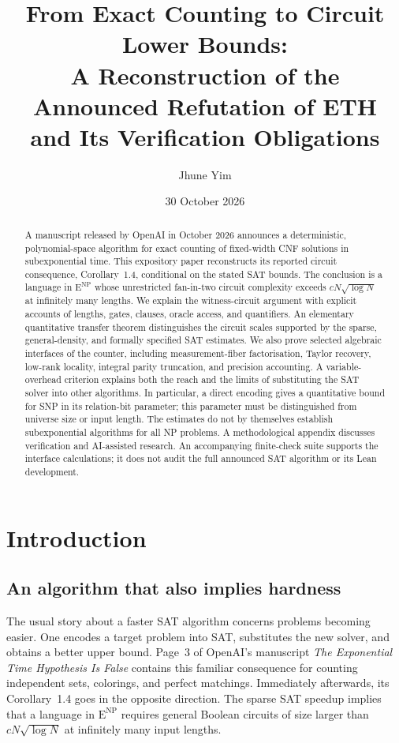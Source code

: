\documentclass[11pt,reqno]{amsart}
\title[From exact counting to circuit lower bounds]{From Exact Counting to
Circuit Lower Bounds:\\ A Reconstruction of the Announced Refutation of ETH\\
and Its Verification Obligations}
\author{Jhune Yim}
\date{30 October 2026}
\numberwithin{equation}{section}
\theoremstyle{plain}
\theoremstyle{definition}
\theoremstyle{remark}
\newcommand{\ENP}{\mathrm E^{\mathrm{NP}}}
\begin{document}
\begin{abstract}
A manuscript released by OpenAI in October 2026 announces a deterministic,
polynomial-space algorithm for exact counting of fixed-width CNF solutions
in subexponential time. This expository paper reconstructs its reported
circuit consequence, Corollary~1.4, conditional on the stated SAT bounds.
The conclusion is a language in $\ENP$ whose unrestricted fan-in-two
circuit complexity exceeds $cN\sqrt{\log N}$ at infinitely many lengths.
We explain the witness-circuit argument with explicit accounts of lengths,
gates, clauses, oracle access, and quantifiers. An elementary quantitative
transfer theorem distinguishes the circuit scales supported by the sparse,
general-density, and formally specified SAT estimates.
We also prove selected algebraic interfaces of the counter, including
measurement-fiber factorisation, Taylor recovery, low-rank locality,
integral parity truncation, and precision accounting. A variable-overhead
criterion explains both the reach and the limits of substituting the SAT
solver into other algorithms. In particular, a direct encoding gives a
quantitative bound for SNP in its relation-bit parameter; this parameter
must be distinguished from universe size or input length. The estimates do
not by themselves establish subexponential algorithms for all NP problems.
A methodological appendix discusses verification and AI-assisted research.
An accompanying finite-check suite supports the interface calculations;
it does not audit the full announced SAT algorithm or its Lean development.
\end{abstract}

\maketitle
\tableofcontents


\section{Introduction}\label{sec:intro}

\subsection{An algorithm that also implies hardness}
The usual story about a faster SAT algorithm concerns problems becoming
easier. One encodes a target problem into SAT, substitutes the new solver,
and obtains a better upper bound. Page~3 of OpenAI's manuscript
\emph{The Exponential Time Hypothesis Is False} \cite{OpenAIPaper} contains
this familiar consequence for counting independent sets, colorings, and
perfect matchings. Immediately afterwards, its Corollary~1.4 goes in the
opposite direction. The sparse SAT speedup implies that a language in
$\ENP$ requires general Boolean circuits of size larger than
$cN\sqrt{\log N}$ at infinitely many input lengths.
\end{document}
